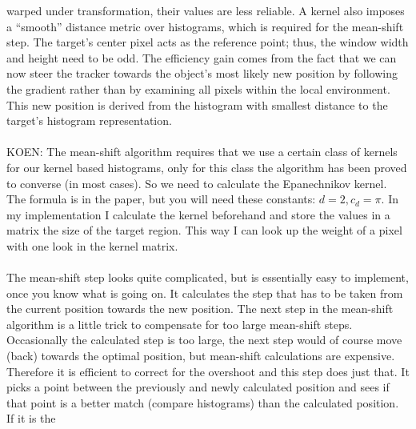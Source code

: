 \documentclass[a4paper,11pt]{article}
\begin{document}
		warped under transformation, their values are less reliable. A kernel
		also imposes a ``smooth'' distance metric over histograms, which is
		required for the mean-shift step. The target's center pixel acts as the
		reference point; thus, the window width and height need to be odd.
		The efficiency gain comes from the fact that we can now steer the
		tracker towards the object's most likely new position by following
		the gradient rather than by examining all pixels within the local
		environment. This new position is derived from the histogram with
		smallest distance to the target's histogram representation.
		\\ \\
		KOEN:
		The mean-shift algorithm requires that we use a certain class of kernels for
		our kernel based histograms, only for this class the algorithm has been proved
		to converse (in most cases). So we need to calculate the Epanechnikov kernel.
		The formula is in the paper, but you will need these constants: $d = 2, c_d = \pi$.
		In my implementation I calculate the kernel beforehand and store the values in a
		matrix the size of the target region. This way I can look up the weight of a pixel
		with one look in the kernel matrix.
		\\ \\
		The mean-shift step looks quite complicated, but is essentially easy to implement,
		once you know what is going on. It calculates the step that has to be taken from
		the current position towards the new position. The next step in the mean-shift
		algorithm is a little trick to compensate for too large mean-shift steps. Occasionally
		the calculated step is too large, the next step would of course move (back) towards
		the optimal position, but mean-shift calculations are expensive. Therefore it is
		efficient to correct for the overshoot and this step does just that. It picks a
		point between the previously and newly calculated position and sees if that point
		is a better match (compare histograms) than the calculated position. If it is the
\end{document}
